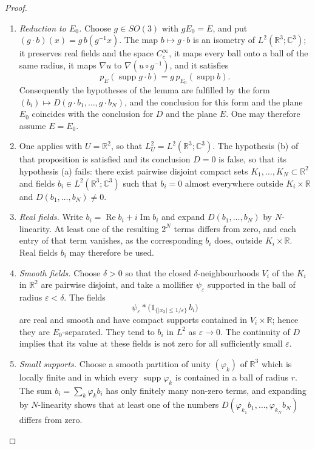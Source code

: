 \documentclass[11pt,letterpaper,reqno]{amsart}
\theoremstyle{definition}
\begin{document}
\begin{proof}
\begin{enumerate}
\item[1.] \emph{Reduction to $E_0$.}
Choose $g\in SO(3)$ with $gE_0=E$, and put $(g\cdot b)(x)=g\,b(g^{-1}x)$.
The map $b\mapsto g\cdot b$ is an isometry of $L^2(\mathbb{R}^3;\mathbb{C}^3)$; it preserves real fields and the space $C_c^\infty$, it maps every ball onto a ball of the same radius, it maps $\nabla u$ to $\nabla(u\circ g^{-1})$, and it satisfies
\begin{equation*}
p_E(\operatorname{supp}g\cdot b)=g\,p_{E_0}(\operatorname{supp}b).
\end{equation*}
Consequently the hypotheses of the lemma are fulfilled by the form $(b_i)\mapsto D(g\cdot b_1,\dots,g\cdot b_N)$, and the conclusion for this form and the plane $E_0$ coincides with the conclusion for $D$ and the plane $E$.
One may therefore assume $E=E_0$.
\item[2.]
One applies \cite[Proposition~8.4]{QEDConstruction} with $U=\mathbb{R}^2$, so that $L^2_U=L^2(\mathbb{R}^3;\mathbb{C}^3)$.
The hypothesis (b) of that proposition is satisfied and its conclusion $D=0$ is false, so that its hypothesis (a) fails: there exist pairwise disjoint compact sets $K_1,\dots,K_N\subset\mathbb{R}^2$ and fields $b_i\in L^2(\mathbb{R}^3;\mathbb{C}^3)$ such that $b_i=0$ almost everywhere outside $K_i\times\mathbb{R}$ and $D(b_1,\dots,b_N)\neq0$.
\item[3.] \emph{Real fields.}
Write $b_i=\operatorname{Re}b_i+i\operatorname{Im}b_i$ and expand $D(b_1,\dots,b_N)$ by $N$-linearity.
At least one of the resulting $2^N$ terms differs from zero, and each entry of that term vanishes, as the corresponding $b_i$ does, outside $K_i\times\mathbb{R}$.
Real fields $b_i$ may therefore be used.
\item[4.] \emph{Smooth fields.}
Choose $\delta>0$ so that the closed $\delta$-neighbourhoods $V_i$ of the $K_i$ in $\mathbb R^2$ are pairwise disjoint, and take a mollifier $\psi_\varepsilon$ supported in the ball of radius $\varepsilon<\delta$.
The fields
\begin{equation*}
\psi_\varepsilon*\bigl(1_{\{|x_3|\le1/\varepsilon\}}\,b_i\bigr)
\end{equation*}
are real and smooth and have compact supports contained in $V_i\times\mathbb{R}$; hence they are $E_0$-separated.
They tend to $b_i$ in $L^2$ as $\varepsilon\to0$.
The continuity of $D$ implies that its value at these fields is not zero for all sufficiently small $\varepsilon$.
\item[5.] \emph{Small supports.}
Choose a smooth partition of unity $(\varphi_k)$ of $\mathbb{R}^3$ which is locally finite and in which every $\operatorname{supp}\varphi_k$ is contained in a ball of radius $r$.
The sum $b_i=\sum_k\varphi_kb_i$ has only finitely many non-zero terms, and expanding by $N$-linearity shows that at least one of the numbers $D(\varphi_{k_1}b_1,\dots,\varphi_{k_N}b_N)$ differs from zero.
\end{enumerate}
\end{proof}
\end{document}
